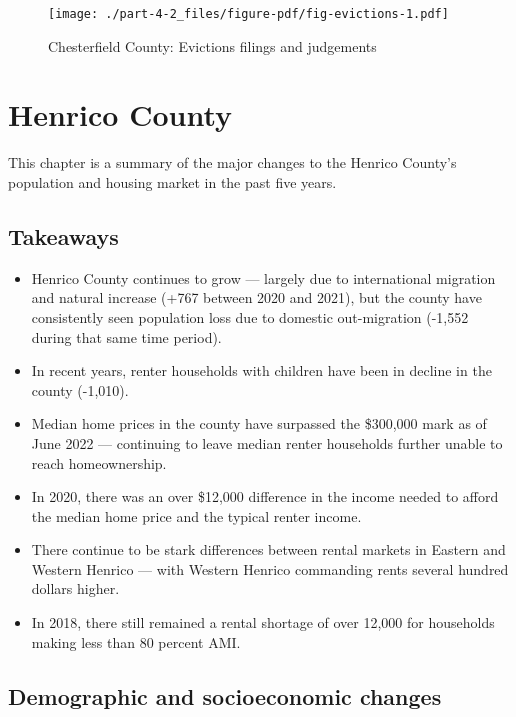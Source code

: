 \documentclass[
  letterpaper,
  DIV=11,
  numbers=noendperiod]{scrreprt}
\providecommand{\tightlist}{%
  \setlength{\itemsep}{0pt}\setlength{\parskip}{0pt}}\usepackage{longtable,booktabs,array}
\begin{document}
\begin{figure}

{\centering \texttt{[image: ./part-4-2\_files/figure-pdf/fig-evictions-1.pdf]}

}

\caption{\label{fig-evictions}Chesterfield County: Evictions filings and
judgements}

\end{figure}

\hypertarget{part-4-3}{%
\chapter{Henrico County}\label{part-4-3}}

This chapter is a summary of the major changes to the Henrico County's
population and housing market in the past five years.

\hypertarget{takeaways-2}{%
\section{Takeaways}\label{takeaways-2}}

\begin{itemize}
\tightlist
\item
  Henrico County continues to grow --- largely due to international
  migration and natural increase (+767 between 2020 and 2021), but the
  county have consistently seen population loss due to domestic
  out-migration (-1,552 during that same time period).
\item
  In recent years, renter households with children have been in decline
  in the county (-1,010).
\item
  Median home prices in the county have surpassed the \$300,000 mark as
  of June 2022 --- continuing to leave median renter households further
  unable to reach homeownership.
\item
  In 2020, there was an over \$12,000 difference in the income needed to
  afford the median home price and the typical renter income.
\item
  There continue to be stark differences between rental markets in
  Eastern and Western Henrico --- with Western Henrico commanding rents
  several hundred dollars higher.
\item
  In 2018, there still remained a rental shortage of over 12,000 for
  households making less than 80 percent AMI.
\end{itemize}

\hypertarget{demographic-and-socioeconomic-changes-2}{%
\section{Demographic and socioeconomic
changes}\label{demographic-and-socioeconomic-changes-2}}
\end{document}
